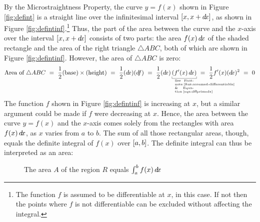 By the Microstraightness Property, the curve $y=f(x)$ shown in Figure
\ref{fig:defint} is a straight line over the infinitesimal interval
$\lbrack x,x+d\!x \rbrack$, as shown in Figure \ref{fig:defintinf}.\footnote{\label{ftnt:assumed-differentiable}The function
$f$ is assumed to be differentiable at $x$, in this case. If not then the points
where $f$ is not differentiable can be excluded without affecting the integral.}
Thus, the part of the area between the curve and the $x$-axis over the interval
$\lbrack x,x+d\!x \rbrack$ consists of two parts: the area $f(x)\,d\!x$ of the shaded
rectangle and the area of the right triangle $\triangle ABC$, both of which are
shown in Figure \ref{fig:defintinf}. However, the area of $\triangle ABC$ is
zero:
\[
\text{Area of }\triangle ABC ~=~ \frac{1}{2}\text{(base)}\times\text{(height)}
~=~ \frac{1}{2}(\dx)(\df) ~=~ \frac{1}{2}(\dx)\underbracket[0.3pt]{(f'(x)\,\dx)}
_{\begin{minipage}[c]{0.09\linewidth}
    \tiny
    See Footnote~\ref{ftnt:assumed-differentiable}\\
    \& Equation~\ref{eqn:dffprimedx}
\end{minipage}}
~=~ \frac{1}{2}f'(x)(\dx)^2 ~=~ 0
\]
The function $f$ shown in Figure \ref{fig:defintinf} is increasing at
$x$, but a similar argument could be made if $f$ were decreasing at $x$.
Hence, the area between the curve $y=f(x)$ and the $x$-axis comes solely from
the rectangles with area $f(x)\,d\!x$, as $x$ varies from $a$ to $b$. The sum of
all those rectangular areas, though, equals the definite integral of $f(x)$ over
$\lbrack a,b \rbrack$. The definite integral can thus be interpreted as an area:

\newpage
\begin{figure}[ht]
 \begin{center}
  \vspace{-6mm}
 \end{center}
 \caption[]{\quad The area $A$ of the region $R$ equals $\int_a^bf(x)\,d\!x$}
 \label{fig:defintarea}
\end{figure}

